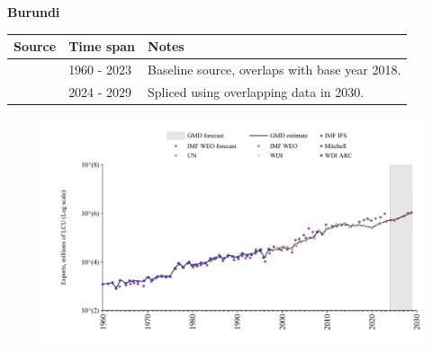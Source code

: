 \documentclass[12pt,a4paper,landscape]{article}
\begin{document}
\begin{adjustbox}{max totalsize={\paperwidth}{\paperheight},center}
\begin{minipage}[t][\textheight][t]{\textwidth}
\vspace*{0.5cm}
{}
\begin{center}
{\Large\bfseries Burundi}
\end{center}
\vspace{0.5cm}
\begin{table}[H]
\centering
\small
\begin{tabular}{|l|l|l|}
\hline
\textbf{Source} & \textbf{Time span} & \textbf{Notes} \\
\hline
\rowcolor{white}\cite{WDI}& 1960 - 2023 &Baseline source, overlaps with base year 2018.\\
\rowcolor{lightgray}\cite{IMF_WEO_forecast}& 2024 - 2029 &Spliced using overlapping data in 2030.\\
\hline
\end{tabular}
\end{table}
\begin{figure}[H]
\centering
\includegraphics[width=\textwidth,height=0.6\textheight,keepaspectratio]{graphs/BDI_exports.pdf}
\end{figure}
\end{minipage}
\end{adjustbox}
\end{document}
